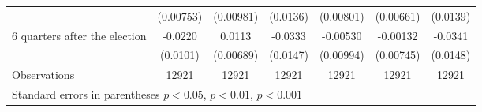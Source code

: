 \begin{table}[!ht]
\begin{tabular}{l*{6}{c}}
                    &   (0.00753)         &   (0.00981)         &    (0.0136)         &   (0.00801)         &   (0.00661)         &    (0.0139)         \\
[0,5em]
 6 quarters after the election&     -0.0220\sym{*}  &      0.0113         &     -0.0333\sym{*}  &    -0.00530         &    -0.00132         &     -0.0341\sym{*}  \\
                    &    (0.0101)         &   (0.00689)         &    (0.0147)         &   (0.00994)         &   (0.00745)         &    (0.0148)         \\
\hline
Observations        &       12921         &       12921         &       12921         &       12921         &       12921         &       12921         \\
\hline\hline
\multicolumn{7}{l}{\footnotesize Standard errors in parentheses \sym{*} \(p<0.05\), \sym{**} \(p<0.01\), \sym{***} \(p<0.001\)}\\
\end{tabular}
\end{table}
